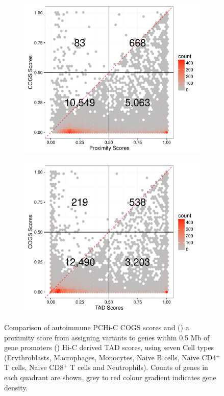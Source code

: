 \documentclass[a4paper,11pt]{report}
\begin{document}
\begin{figure}[h]
\centering
	 \begin{subfigure}{0.7\textwidth}
		\includegraphics[width=\linewidth]{prox_compare.pdf}
		\caption{}\label{fig:fig_a}
	\end{subfigure}
	\hspace{1cm}
	\begin{subfigure}{0.7\textwidth}
		\includegraphics[width=\linewidth]{tad_compare.pdf}
		\caption{}\label{fig:fig_b}
	\end{subfigure}
\begin{minipage}[t]{0.7\textwidth}
	\caption{Comparison of autoimmune PCHi-C COGS scores and () a proximity score from assigning variants to genes within 0.5 Mb of gene promoters () Hi-C derived TAD scores, using seven Cell types (Erythroblasts, Macrophages, Monocytes, Naive B cells, Naive CD4$^{+}$ T cells, Naive CD8$^{+}$ T cells and Neutrophils). Counts of genes in each quadrant are shown, grey to red colour gradient indicates gene density.}
	\label{fig:cog_prox_comparison}
\end{minipage}
\end{figure} 
\end{document}
